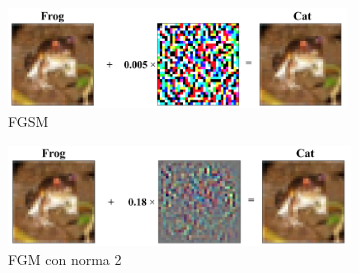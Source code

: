 \begin{figure}[h!]
    \centering
    \includegraphics[width=0.8\textwidth]{images/cifar-10/frog_cat_fgsm.png}
    \caption{FGSM}
    \label{frog_cat_fgsm}
\end{figure}

\begin{figure}[h!]
    \centering
    \includegraphics[width=0.81\textwidth]{images/cifar-10/frog_cat_fgm.png}
    \caption{FGM con norma 2}
    \label{frog_cat_fgm}
\end{figure}


